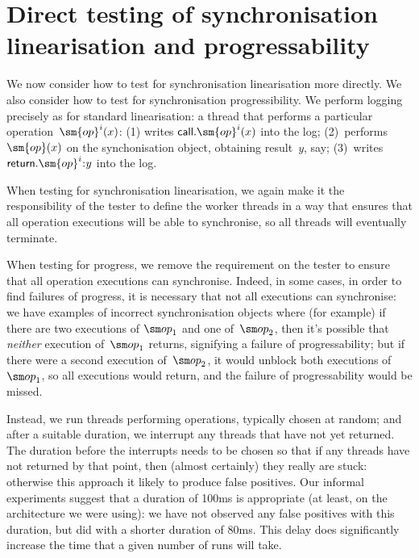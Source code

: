 \section{Direct testing of synchronisation linearisation and progressability}
\label{sec:direct}

We now consider how to test for synchronisation linearisation more directly.
We also consider how to test for synchronisation progressibility.  
We perform logging precisely as for standard linearisation: a thread that
performs a particular operation~$\sm{op}^i(x)$: (1) writes
$\call.\sm{op}^i(x)$ into the log; (2)~performs $\sm{op}(x)$ on the
synchonisation object, obtaining result~$y$, say; (3)~writes
$\return.\sm{op}^i \:: y$ into the log.  

When testing for synchronisation linearisation, we again make it the
responsibility of the tester to define the worker threads in a way that
ensures that all operation executions will be able to synchronise, so all
threads will eventually terminate. 

When testing for progress, we remove the requirement on the tester to ensure
that all operation executions can synchronise.  Indeed, in some cases, in
order to find failures of progress, it is necessary that not all executions
can synchronise: we have examples of incorrect synchronisation objects where
(for example) if there are two executions of $\op_1$ and one of~$\op_2$, then
it's possible that \emph{neither} execution of~$\op_1$ returns, signifying
a failure of progressability; but if there were a second execution
of~$\op_2$, it would unblock both executions of~$\op_1$, so all executions
would return, and the failure of progressability would be missed.

Instead, we run threads performing operations, typically chosen at random; and
after a suitable duration, we interrupt any threads that have not yet
returned.  The duration before the interrupts needs to be chosen so that if
any threads have not returned by that point, then (almost certainly) they
really are stuck: otherwise this approach it likely to produce false
positives.  Our informal experiments suggest that a duration of 100ms is
appropriate (at least, on the architecture we were using): we have not
observed any false positives with this duration, but did with a shorter
duration of 80ms.  This delay does significantly increase the time that a
given number of runs will take.

